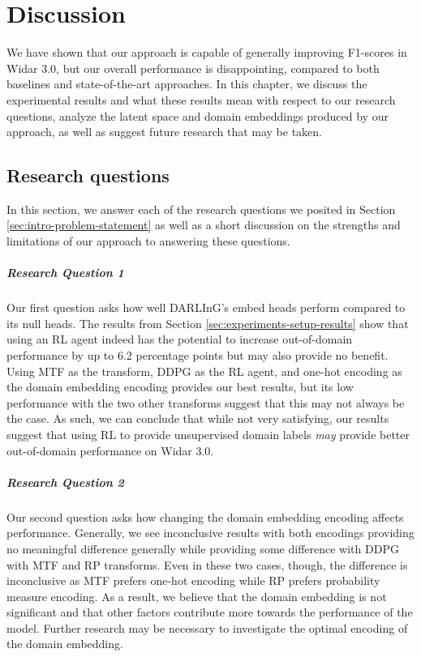 \chapter{Discussion}

We have shown that our approach is capable of generally improving F1-scores in Widar 3.0, but our overall performance is disappointing, compared to both baselines and state-of-the-art approaches.
In this chapter, we discuss the experimental results and what these results mean with respect to our research questions, analyze the latent space and domain embeddings produced by our approach, as well as suggest future research that may be taken.

\section{Research questions}

In this section, we answer each of the research questions we posited in Section \ref{sec:intro-problem-statement} as well as a short discussion on the strengths and limitations of our approach to answering these questions.

\paragraph{Research Question 1}
Our first question asks how well DARLInG's embed heads perform compared to its null heads.
The results from Section \ref{sec:experiments-setup-results} show that using an RL agent indeed has the potential to increase out-of-domain performance by up to 6.2 percentage points but may also provide no benefit.
Using MTF as the transform, DDPG as the RL agent, and one-hot encoding as the domain embedding encoding provides our best results, but its low performance with the two other transforms suggest that this may not always be the case.
As such, we can conclude that while not very satisfying, our results suggest that using RL to provide unsupervised domain labels \textit{may} provide better out-of-domain performance on Widar 3.0.

\paragraph{Research Question 2}
Our second question asks how changing the domain embedding encoding affects performance.
Generally, we see inconclusive results with both encodings providing no meaningful difference generally while providing some difference with DDPG with MTF and RP transforms.
Even in these two cases, though, the difference is inconclusive as MTF prefers one-hot encoding while RP prefers probability measure encoding.
As a result, we believe that the domain embedding is not significant and that other factors contribute more towards the performance of the model.
Further research may be necessary to investigate the optimal encoding of the domain embedding.

